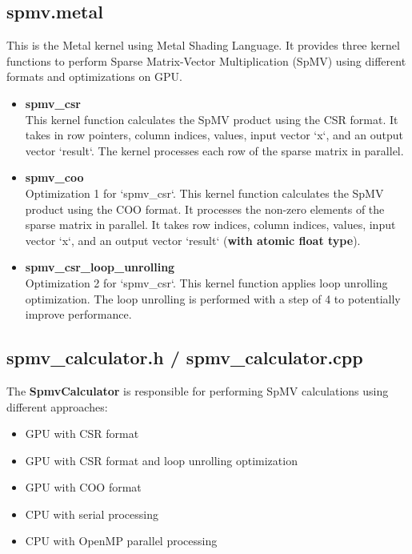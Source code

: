 \documentclass[12pt]{article}
\begin{document}
\subsection{spmv.metal}
This is the Metal kernel using Metal Shading Language. It provides three kernel functions to perform Sparse Matrix-Vector Multiplication (SpMV) using different formats and optimizations on GPU.

\begin{itemize}
    \item \textbf{spmv\_csr} \\
    This kernel function calculates the SpMV product using the CSR format. It takes in row pointers, column indices, values, input vector `x`, and an output vector `result`. The kernel processes each row of the sparse matrix in parallel.

    \item \textbf{spmv\_coo} \\
    Optimization 1 for `spmv\_csr`. This kernel function calculates the SpMV product using the COO format. It processes the non-zero elements of the sparse matrix in parallel. It takes row indices, column indices, values, input vector `x`, and an output vector `result` (\textbf{with atomic float type}).

    \item \textbf{spmv\_csr\_loop\_unrolling} \\
    Optimization 2 for `spmv\_csr`. This kernel function applies loop unrolling optimization. The loop unrolling is performed with a step of 4 to potentially improve performance.
\end{itemize}

\subsection{spmv\_calculator.h / spmv\_calculator.cpp}
The \textbf{SpmvCalculator} is responsible for performing SpMV calculations using different approaches:

\begin{itemize}
    \item GPU with CSR format
    \item GPU with CSR format and loop unrolling optimization
    \item GPU with COO format
    \item CPU with serial processing
    \item CPU with OpenMP parallel processing
\end{itemize}
\end{document}
